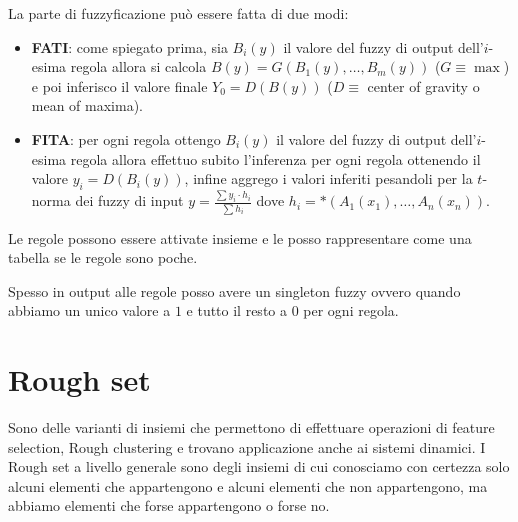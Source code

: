 La parte di fuzzyficazione può essere fatta di due modi:
\begin{itemize}
    \item \textbf{FATI}: come spiegato prima, sia $B_i(y)$ il valore del fuzzy di 
    output dell'$i$-esima regola allora si calcola $B(y)= G(B_1(y),\dots, B_m(y))$
    ($G\equiv \max$) e poi inferisco il valore finale $Y_0=D(B(y))$ ($D\equiv$ center of 
    gravity o mean of maxima).
    \item \textbf{FITA}: per ogni regola ottengo $B_i(y)$ il valore del fuzzy di 
    output dell'$i$-esima regola allora effettuo subito l'inferenza per ogni 
    regola ottenendo il valore $y_i=D(B_i(y))$, infine aggrego i valori inferiti 
    pesandoli per la $t$-norma dei fuzzy di input $y=\frac{\sum y_i\cdot h_i}{\sum h_i}$
    dove $h_i=\ast(A_1(x_1),\dots,A_n(x_n))$.
\end{itemize}
\begin{nota}
Le regole possono essere attivate insieme e le posso rappresentare come una tabella 
se le regole sono poche.
\end{nota}

Spesso in output alle regole posso avere un singleton fuzzy ovvero quando abbiamo 
un unico valore a $1$ e tutto il resto a $0$ per ogni regola.

\section{Rough set}

Sono delle varianti di insiemi che permettono di effettuare operazioni di feature 
selection, Rough clustering e trovano applicazione anche ai sistemi dinamici.
I Rough set a livello generale sono degli insiemi di cui conosciamo con certezza 
solo alcuni elementi che appartengono e alcuni elementi che non appartengono, ma 
abbiamo elementi che forse appartengono o forse no.

